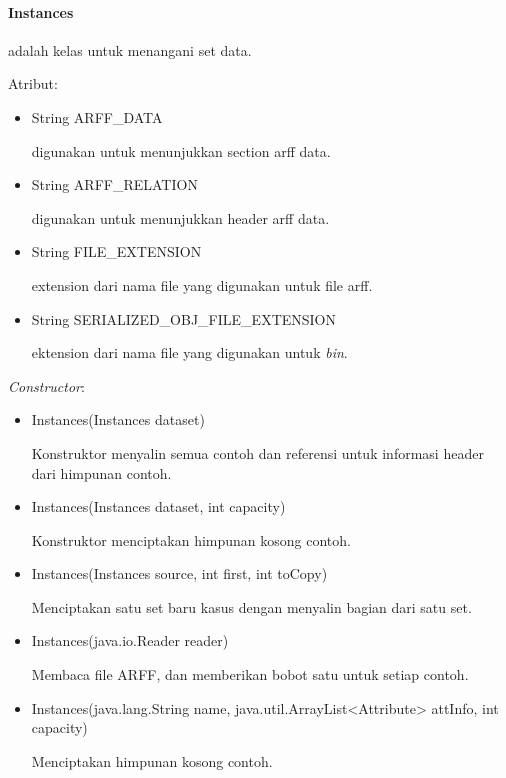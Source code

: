 \paragraph{Instances} adalah kelas untuk menangani set data.

Atribut:
\begin{itemize}
	
	\item String ARFF\_DATA
	
	digunakan untuk menunjukkan section arff data.
	
	\item String ARFF\_RELATION
	
	digunakan untuk menunjukkan header arff data.
	
	\item String FILE\_EXTENSION
	
	extension dari nama file yang digunakan untuk file arff.
	
	\item String SERIALIZED\_OBJ\_FILE\_EXTENSION
	
	ektension dari nama file yang digunakan untuk \textsl{bin}.
\end{itemize}

\textsl{Constructor}:
\begin{itemize}
	\item Instances(Instances dataset)
	
	Konstruktor menyalin semua contoh dan referensi untuk informasi header dari himpunan contoh.
	
	\item Instances(Instances dataset, int capacity)
	
	
	Konstruktor menciptakan himpunan kosong contoh.
	
	\item Instances(Instances source, int first, int toCopy)
	
	Menciptakan satu set baru kasus dengan menyalin bagian dari satu set.
	
	\item Instances(java.io.Reader reader)
	
	Membaca file ARFF, dan memberikan bobot satu untuk setiap contoh.
	
	\item Instances(java.lang.String name, java.util.ArrayList<Attribute> attInfo, int capacity)
	
	Menciptakan himpunan kosong contoh.
\end{itemize}

